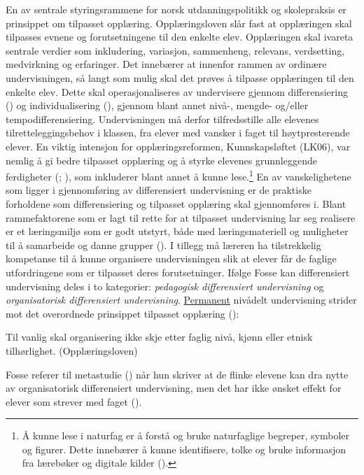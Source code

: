 \documentclass[main.tex]{subfiles}
\begin{document}
En av sentrale styringsrammene for norsk utdanningspolitikk og skolepraksis er prinsippet om tilpasset opplæring. Opplæringsloven slår fast at opplæringen skal tilpasses evnene og forutsetningene til den enkelte elev. Opplæringen skal ivareta sentrale verdier som inkludering, variasjon, sammenheng, relevans, verdsetting, medvirkning og erfaringer. Det innebærer at innenfor rammen av ordinære undervisningen, så langt som mulig skal det prøves å tilpasse opplæringen til den enkelte elev. Dette skal operasjonaliseres av undervisere gjennom differensiering () og individualisering (), gjennom blant annet nivå-, mengde- og/eller tempodifferensiering. Undervisningen må derfor tilfredsstille alle elevenes tilretteleggingsbehov i klassen, fra elever med vansker i faget til høytpresterende elever. En viktig intensjon for opplæringsreformen, Kunnskapsløftet (LK06), var nemlig å gi bedre tilpasset opplæring og å styrke elevenes grunnleggende ferdigheter (; ), som inkluderer blant annet å kunne lese.\footnote{Å kunne lese i naturfag er å forstå og bruke naturfaglige begreper, symboler og figurer. Dette innebærer å kunne identifisere, tolke og bruke informasjon fra lærebøker og digitale kilder ().}
\newline\newline
En av vanskelighetene som ligger i gjennomføring av differensiert undervisning er de praktiske forholdene som differensiering og tilpasset opplæring skal gjennomføres i. Blant rammefaktorene som er lagt til rette for at tilpasset undervisning lar seg realisere er et læringsmiljø som er godt utstyrt, både med læringsmateriell og muligheter til å samarbeide og danne grupper (). I tillegg må læreren ha tilstrekkelig kompetanse til å kunne organisere undervisningen  slik at elever får de faglige utfordringene som er tilpasset deres forutsetninger.
\newline\newline
Ifølge Fosse kan differensiert undervisning deles i to kategorier: \emph{pedagogisk differensiert undervisning} og \emph{organisatorisk differensiert undervisning}. \underline{Permanent} nivådelt undervisning strider mot det overordnede prinsippet tilpasset opplæring ():
\begin{displayquote}
\textelp{} Til vanlig skal organisering ikke skje etter faglig nivå, kjønn eller etnisk tilhørlighet. (Opplæringsloven)
\end{displayquote}
Fosse referer til metastudie () når hun skriver at de flinke elevene kan dra nytte av organisatorisk differensiert undervisning, men det har ikke ønsket effekt for elever som strever med faget ().
\end{document}
